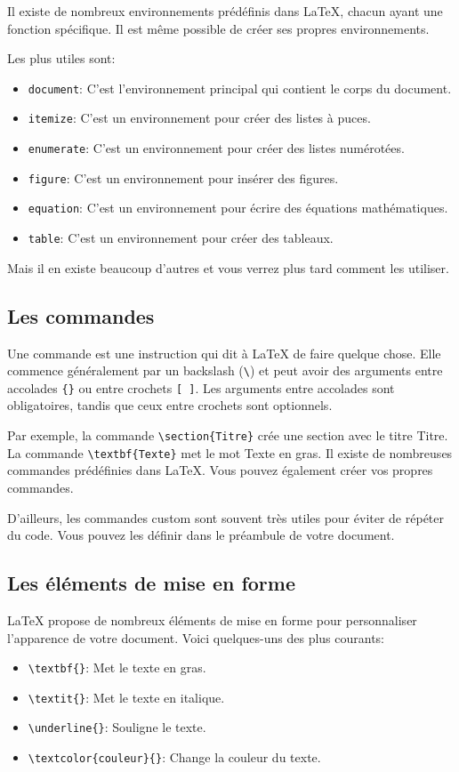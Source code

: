 Il existe de nombreux environnements prédéfinis dans LaTeX, chacun ayant une fonction spécifique.
Il est même possible de créer ses propres environnements.

Les plus utiles sont:
\begin{itemize}
    \item \texttt{document}: C'est l'environnement principal qui contient le corps du document.
    \item \texttt{itemize}: C'est un environnement pour créer des listes à puces.
    \item \texttt{enumerate}: C'est un environnement pour créer des listes numérotées.
    \item \texttt{figure}: C'est un environnement pour insérer des figures.
    \item \texttt{equation}: C'est un environnement pour écrire des équations mathématiques.
    \item \texttt{table}: C'est un environnement pour créer des tableaux.
\end{itemize}

Mais il en existe beaucoup d'autres et vous verrez plus tard comment les utiliser.

\subsection{Les commandes}\label{subsec:latex_commands}
Une commande est une instruction qui dit à LaTeX de faire quelque chose.
Elle commence généralement par un backslash (\texttt{\textbackslash}) et peut avoir des arguments entre accolades \texttt{\{\}} ou entre crochets \texttt{[ ]}.
Les arguments entre accolades sont obligatoires, tandis que ceux entre crochets sont optionnels.

Par exemple, la commande \texttt{\textbackslash{}section\{Titre\}} crée une section avec le titre \og{}Titre\fg{}.
La commande \texttt{\textbackslash{}textbf\{Texte\}} met le mot \og{}Texte\fg{} en gras.
Il existe de nombreuses commandes prédéfinies dans LaTeX. Vous pouvez également créer vos propres commandes.

D'ailleurs, les commandes custom sont souvent très utiles pour éviter de répéter du code.
Vous pouvez les définir dans le préambule de votre document.

\subsection{Les éléments de mise en forme}\label{subsec:latex_formatting}
LaTeX propose de nombreux éléments de mise en forme pour personnaliser l'apparence de votre document.
Voici quelques-uns des plus courants:
\begin{itemize}
    \item \texttt{\textbackslash{}textbf\{\}}: Met le texte en gras.
    \item \texttt{\textbackslash{}textit\{\}}: Met le texte en italique.
    \item \texttt{\textbackslash{}underline\{\}}: Souligne le texte.
    \item \texttt{\textbackslash{}textcolor\{couleur\}\{\}}: Change la couleur du texte.
\end{itemize}

